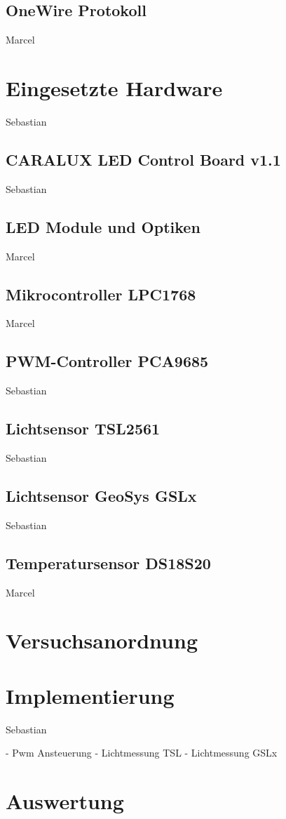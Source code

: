 \documentclass[a4paper,12pt]{scrartcl}
\begin{document}
\subsection{OneWire Protokoll}
Marcel

\clearpage
\section{Eingesetzte Hardware}
Sebastian
\subsection{CARALUX LED Control Board v1.1}
Sebastian
\subsection{LED Module und Optiken}
Marcel
\subsection{Mikrocontroller LPC1768}
Marcel
\subsection{PWM-Controller PCA9685}
Sebastian
\subsection{Lichtsensor TSL2561}
Sebastian
\subsection{Lichtsensor GeoSys GSLx}
Sebastian
\subsection{Temperatursensor DS18S20}
Marcel

\clearpage
\section{Versuchsanordnung}

\clearpage
\section{Implementierung}
Sebastian

- Pwm Ansteuerung
- Lichtmessung TSL
- Lichtmessung GSLx


\clearpage
\section{Auswertung}
\end{document}

